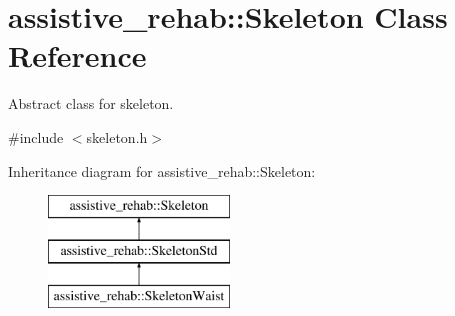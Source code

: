 \section{assistive\+\_\+rehab\+::Skeleton Class Reference}
\label{classassistive__rehab_1_1Skeleton}


Abstract class for skeleton.  




{\ttfamily \#include $<$skeleton.\+h$>$}

Inheritance diagram for assistive\+\_\+rehab\+::Skeleton\+:\begin{figure}[H]
\begin{center}
\leavevmode
\includegraphics[height=3.000000cm]{classassistive__rehab_1_1Skeleton}
\end{center}
\end{figure}
